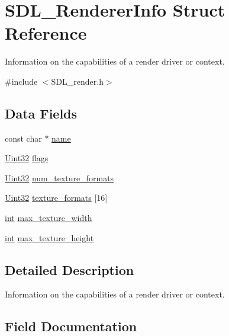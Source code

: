 \hypertarget{struct_s_d_l___renderer_info}{}\section{S\+D\+L\+\_\+\+Renderer\+Info Struct Reference}
\label{struct_s_d_l___renderer_info}


Information on the capabilities of a render driver or context.  




{\ttfamily \#include $<$S\+D\+L\+\_\+render.\+h$>$}

\subsection*{Data Fields}
\begin{DoxyCompactItemize}
\item 
const char $\ast$ \hyperlink{struct_s_d_l___renderer_info_a8f8f80d37794cde9472343e4487ba3eb}{name}
\item 
\hyperlink{_s_d_l__stdinc_8h_add440eff171ea5f55cb00c4a9ab8672d}{Uint32} \hyperlink{struct_s_d_l___renderer_info_a048097c5cc2146ce1ff2450684f1b51c}{flags}
\item 
\hyperlink{_s_d_l__stdinc_8h_add440eff171ea5f55cb00c4a9ab8672d}{Uint32} \hyperlink{struct_s_d_l___renderer_info_a0cfcc641f2a99b9f5a0e3e3eb5fbbefe}{num\+\_\+texture\+\_\+formats}
\item 
\hyperlink{_s_d_l__stdinc_8h_add440eff171ea5f55cb00c4a9ab8672d}{Uint32} \hyperlink{struct_s_d_l___renderer_info_ac164ceadcdd8ed21d07370501fffed2c}{texture\+\_\+formats} \mbox{[}16\mbox{]}
\item 
\hyperlink{_s_d_l__thread_8h_a6a64f9be4433e4de6e2f2f548cf3c08e}{int} \hyperlink{struct_s_d_l___renderer_info_abe1e7efe1a1dae989c33c89e0597493d}{max\+\_\+texture\+\_\+width}
\item 
\hyperlink{_s_d_l__thread_8h_a6a64f9be4433e4de6e2f2f548cf3c08e}{int} \hyperlink{struct_s_d_l___renderer_info_a0660205b899cefb8b2c807dc244296f7}{max\+\_\+texture\+\_\+height}
\end{DoxyCompactItemize}


\subsection{Detailed Description}
Information on the capabilities of a render driver or context. 

\subsection{Field Documentation}
